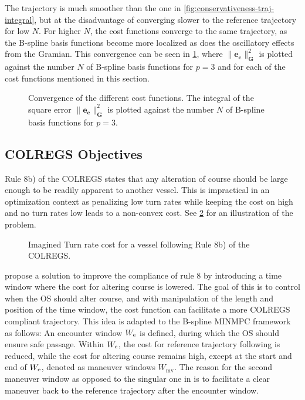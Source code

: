 The trajectory is much smoother than the one in \cref{fig:conservativeness-traj-integral}, but at the disadvantage of converging slower to the reference trajectory for low $N$. For higher $N$, the  cost functions converge to the same trajectory, as the B-spline basis functions become more localized as does the oscillatory effects from the Gramian. This convergence can be seen in \cref{fig:conservativeness}, where $\|\mathbf e_\mathbf c\|_\mathbf G^2$ is plotted against the number $N$ of B-spline basis functions for $p=3$ and for each of the cost functions mentioned in this section.


\begin{figure}
    \centering
    
    \caption{Convergence of the different cost functions. The integral of the square error $\|\mathbf e_\mathbf c\|_\mathbf G^2$ is plotted against the number $N$ of B-spline basis functions for $p=3$.}
    \label{fig:conservativeness}
\end{figure}




\FloatBarrier
\subsection{COLREGS Objectives}\label{sec:colregs-objectives}
Rule 8b) of the COLREGS states that any alteration of course should be large enough to be readily apparent to another vessel. This is impractical in an optimization context as penalizing low turn rates while keeping the cost on high and no turn rates low leads to a non-convex cost. See \cref{fig:turn-rate-cost} for an illustration of the problem. 

\begin{figure}
    \centering
    
    \caption{Imagined Turn rate cost for a vessel following Rule 8b) of the COLREGS.}
    \label{fig:turn-rate-cost}
\end{figure}

\cite{Thyri2022-MPC} propose a solution to improve the compliance of rule 8 by introducing a time window where the cost for altering course is lowered. The goal of this is to control when the OS should alter course, and with manipulation of the length and position of the time window, the cost function can facilitate a more COLREGS compliant trajectory. This idea is adapted to the B-spline MINMPC framework as follows:
An encounter window $W_\text e$ is defined, during which the OS should ensure safe passage. Within $W_\text e$, the cost for reference trajectory following is reduced, while the cost for altering course remains high, except at the start and end of $W_\text e$, denoted as maneuver windows $W_\text{mv}$. 
The reason for the second maneuver window as opposed to the singular one in \cite{Thyri2022-MPC} is to facilitate a clear maneuver back to the reference trajectory after the encounter window.

